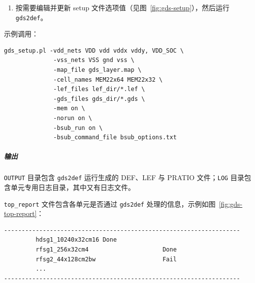 \begin{enumerate}
\begin{itemize}
    示例：\texttt{-start\_layer m1}
    \item \texttt{-core\_start\_layer}——指定 core 提取的起始层。
    
    示例：\texttt{-core\_start\_layer m3}
    \item \texttt{-options\_file}——指定包含额外 \texttt{gds2def} 选项列表的输入文件。
    \item \texttt{-norun [ on | off ]}——设为 \texttt{on} 时仅创建配置文件，不运行 \texttt{gds2def}。默认 \texttt{off}。
    \item \texttt{-bsub\_run [ on | off ]}——设为 \texttt{on} 时，将作业提交到 LSF 集群，在多台机器上并行执行。默认 \texttt{off}。
    \item \texttt{-bsub\_command\_file}——指定包含 \texttt{bsub} 命令及定义多机执行要求的额外选项的文件。若未指定，则仅使用 \texttt{bsub} 作为命令。
  \end{itemize}
  \item 按需要编辑并更新 setup 文件选项值（见图~\ref{fig:gds-setup}），然后运行 \texttt{gds2def}。
\end{enumerate}

示例调用：
\begin{lstlisting}
gds_setup.pl -vdd_nets VDD vdd vddx vddy, VDD_SOC \
              -vss_nets VSS gnd vss \
              -map_file gds_layer.map \
              -cell_names MEM22x64 MEM22x32 \
              -lef_files lef_dir/*.lef \
              -gds_files gds_dir/*.gds \
              -mem on \
              -norun on \
              -bsub_run on \
              -bsub_command_file bsub_options.txt
\end{lstlisting}

\label{fig:gds-setup}

\subparagraph{输出}
\texttt{OUTPUT} 目录包含 \texttt{gds2def} 运行生成的 DEF、LEF 与 PRATIO 文件；\texttt{LOG} 目录包含单元专用日志目录，其中又有日志文件。

\texttt{top\_report} 文件包含各单元是否通过 \texttt{gds2def} 处理的信息，示例如图~\ref{fig:gds-top-report}：
\begin{verbatim}
-------------------------------------------------------------------
         hdsg1_10240x32cm16 Done
         rfsg1_256x32cm4                     Done
         rfsg2_44x128cm2bw                   Fail
         ...
-------------------------------------------------------------------
\end{verbatim}

\label{fig:gds-top-report}

